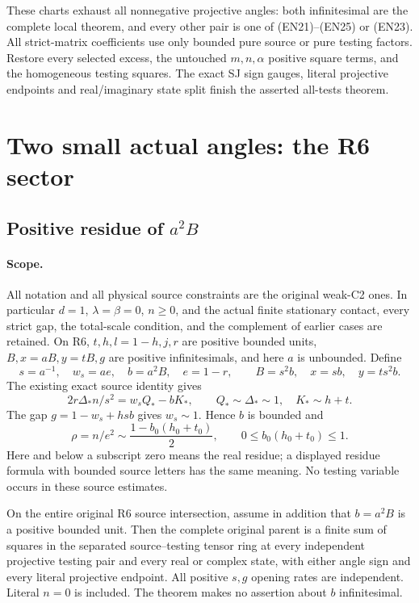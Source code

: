These charts exhaust all nonnegative projective angles:
both infinitesimal are the complete local theorem, and every other
pair is one of (EN21)--(EN25) or (EN23).
All strict-matrix coefficients use only bounded pure source or
pure testing factors. Restore every selected excess, the untouched
$m,n,\alpha$ positive square terms, and the homogeneous testing squares.
The exact SJ sign gauges, literal projective endpoints and
real/imaginary state split finish the asserted all-tests theorem.

\section{Two small actual angles: the R6 sector}
\subsection{Positive residue of $a^2B$}
\label{component:pb60eba754641}

\label{pb60eba754641:sec:r6-b-unit}

\paragraph{Scope.}
All notation and all physical source constraints are the original weak-C2
ones. In particular $d=1$, $\lambda=\beta=0$, $n\geq0$, and the actual
finite stationary contact, every strict gap, the total-scale condition,
and the complement of earlier cases are retained. On R6,
$t,h,l=1-h,j,r$ are positive bounded units, $B,x=aB,y=tB,g$ are
positive infinitesimals, and here $a$ is unbounded. Define
\[
 s=a^{-1},\quad w_s=ae,\quad b=a^2B,\quad e=1-r,
 \qquad B=s^2b,\quad x=sb,\quad y=ts^2b.
 \tag{RB1}
\]
The existing exact source identity gives
\[
 2r\Delta_*n/s^2=w_sQ_*-bK_*,\qquad
 Q_*\sim\Delta_*\sim1,\quad K_*\sim h+t.
 \tag{RB2}
\]
The gap $g=1-w_s+hsb$ gives $w_s\sim1$. Hence $b$ is bounded and
\[
 \rho=n/e^2\sim\frac{1-b_0(h_0+t_0)}2,\qquad
 0\leq b_0(h_0+t_0)\leq1.                         \tag{RB3}
\]
Here and below a subscript zero means the real residue; a displayed
residue formula with bounded source letters has the same meaning.
No testing variable occurs in these source estimates.

\begin{theorem}
On the entire original R6 source intersection, assume in addition that
$b=a^2B$ is a positive bounded unit. Then the complete original parent
is a finite sum of squares in the separated source--testing tensor ring
at every independent projective testing pair and every real or complex
state, with either angle sign and every literal projective endpoint.
All positive $s,g$ opening rates are independent. Literal $n=0$ is
included. The theorem makes no assertion about $b$ infinitesimal.
\end{theorem}

